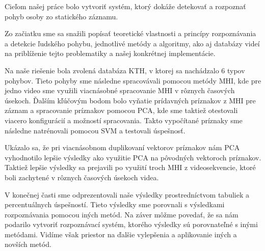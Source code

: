 Cieľom našej práce bolo vytvoriť systém, ktorý dokáže detekovať a rozpoznať pohyb osoby zo statického záznamu. 

Zo začiatku sme sa snažili popísať teoretické vlastnosti a princípy rozpoznávania a detekcie ľudského pohybu, jednotlivé metódy a algoritmy, ako aj databázy videí na priblíženie tejto problematiky a našej konkrétnej implementácie.

Na naše riešenie bola zvolená databáza KTH, v ktorej sa nachádzalo 6 typov pohybov. Tieto pohyby sme následne spracovávali pomocou metódy MHI, kde pre jedno video sme využili viacnásobné spracovanie MHI v rôznych časových úsekoch. Ďalším kľúčovým bodom bolo vyňatie prídavných príznakov z MHI pre záznam a spracovanie príznakov pomocou PCA, kde sme taktiež otestovali viacero konfigurácií a možností spracovania. Takto vypočítané príznaky sme následne natrénovali pomocou SVM a testovali úspešnosť. 

Ukázalo sa, že pri viacnásobnom duplikovaní vektorov príznakov nám PCA vyhodnotilo lepšie výsledky ako využitie PCA na pôvodných vektoroch príznakov. Taktiež lepšie výsledky sa prejavili po využití troch MHI z videosekvencie, ktoré boli zachytené v rôznych časových úsekoch videa. 

V konečnej časti sme odprezentovali naše výsledky prostredníctvom tabuliek a percentuálnych úspešností. Tieto výsledky sme porovnali s výsledkami rozpoznávania pomocou iných metód. 
Na záver môžme povedať, že sa nám podarilo vytvoriť rozpoznávací systém, ktorého výsledky sú porovnateľné s inými metódami. Vidíme však priestor na ďalšie vylepšenia a aplikovanie iných a novších metód.

